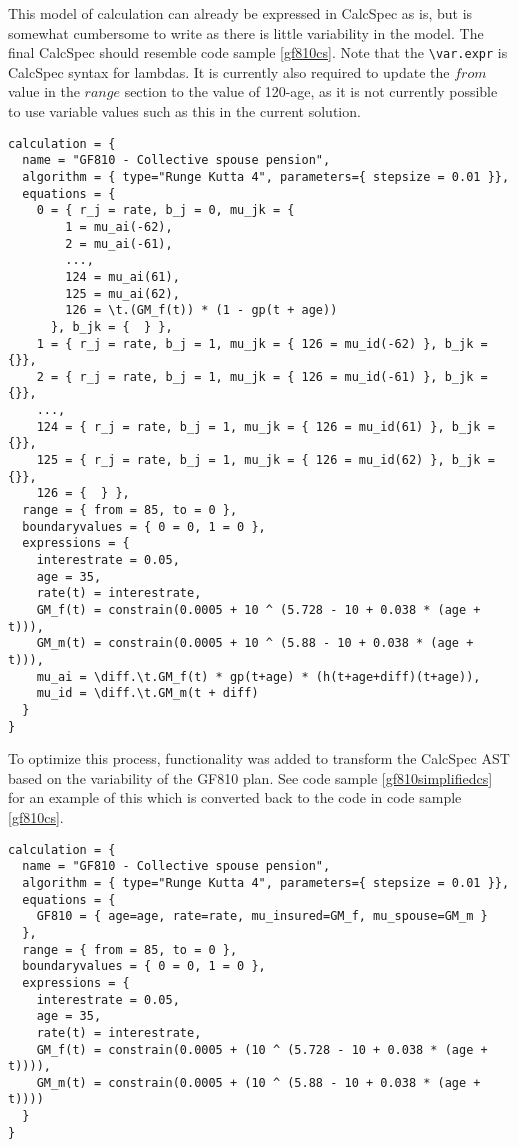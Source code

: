 This model of calculation can already be expressed in CalcSpec as is, but is somewhat cumbersome to write as there is little variability in the model.
The final CalcSpec should resemble code sample \ref{gf810cs}.
Note that the \lstinline$\var.expr$ is CalcSpec syntax for lambdas. 
It is currently also required to update the $from$ value in the $range$ section to the value of 120-age, as it is not currently possible to use variable values such as this in the current solution.
\clearpage
\begin{lstlisting}[language=calcspec, caption=GF810 full CalcSpec, label=gf810cs]
calculation = {
  name = "GF810 - Collective spouse pension", 
  algorithm = { type="Runge Kutta 4", parameters={ stepsize = 0.01 }}, 
  equations = { 
    0 = { r_j = rate, b_j = 0, mu_jk = { 
        1 = mu_ai(-62),
        2 = mu_ai(-61),
        ...,
        124 = mu_ai(61), 
        125 = mu_ai(62), 
        126 = \t.(GM_f(t)) * (1 - gp(t + age))
      }, b_jk = {  } }, 
    1 = { r_j = rate, b_j = 1, mu_jk = { 126 = mu_id(-62) }, b_jk = {}}, 
    2 = { r_j = rate, b_j = 1, mu_jk = { 126 = mu_id(-61) }, b_jk = {}}, 
    ...,
    124 = { r_j = rate, b_j = 1, mu_jk = { 126 = mu_id(61) }, b_jk = {}}, 
    125 = { r_j = rate, b_j = 1, mu_jk = { 126 = mu_id(62) }, b_jk = {}}, 
    126 = {  } }, 
  range = { from = 85, to = 0 }, 
  boundaryvalues = { 0 = 0, 1 = 0 }, 
  expressions = { 
    interestrate = 0.05, 
    age = 35, 
    rate(t) = interestrate, 
    GM_f(t) = constrain(0.0005 + 10 ^ (5.728 - 10 + 0.038 * (age + t))), 
    GM_m(t) = constrain(0.0005 + 10 ^ (5.88 - 10 + 0.038 * (age + t))), 
    mu_ai = \diff.\t.GM_f(t) * gp(t+age) * (h(t+age+diff)(t+age)), 
    mu_id = \diff.\t.GM_m(t + diff) 
  }
}
\end{lstlisting}

To optimize this process, functionality was added to transform the CalcSpec AST based on the variability of the GF810 plan.
See code sample \ref{gf810simplifiedcs} for an example of this which is converted back to the code in code sample \ref{gf810cs}.
\begin{lstlisting}[language=calcspec, caption=GF810 simplified CalcSpec, label=gf810simplifiedcs]
calculation = { 
  name = "GF810 - Collective spouse pension", 
  algorithm = { type="Runge Kutta 4", parameters={ stepsize = 0.01 }}, 
  equations = { 
    GF810 = { age=age, rate=rate, mu_insured=GM_f, mu_spouse=GM_m }
  }, 
  range = { from = 85, to = 0 }, 
  boundaryvalues = { 0 = 0, 1 = 0 }, 
  expressions = { 
    interestrate = 0.05,
    age = 35,
    rate(t) = interestrate,
    GM_f(t) = constrain(0.0005 + (10 ^ (5.728 - 10 + 0.038 * (age + t)))),
    GM_m(t) = constrain(0.0005 + (10 ^ (5.88 - 10 + 0.038 * (age + t))))
  }
}
\end{lstlisting}

